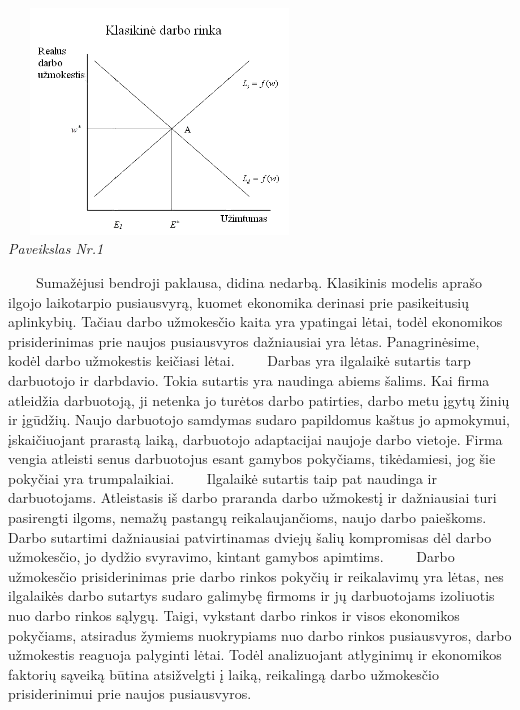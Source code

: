 \documentclass[12pt,a4paper]{article}
\theoremstyle{change}\newtheorem{salyga}{Uždavinys}
\begin{document}
\begin{center}
\includegraphics[width=80mm,height=60mm]{darborinka.PNG}
\\
\textit{Paveikslas Nr.1}
\end{center}

\vskip 8pt
$\qquad $Sumažėjusi bendroji paklausa, didina nedarbą. Klasikinis modelis aprašo ilgojo laikotarpio pusiausvyrą, kuomet ekonomika derinasi prie pasikeitusių aplinkybių. Tačiau darbo užmokesčio kaita yra ypatingai lėtai, todėl ekonomikos prisiderinimas prie naujos pusiausvyros dažniausiai yra lėtas. Panagrinėsime, kodėl darbo užmokestis keičiasi lėtai.
\vskip 8pt
$\qquad $Darbas yra ilgalaikė sutartis tarp darbuotojo ir darbdavio. Tokia sutartis yra naudinga abiems šalims. Kai firma atleidžia darbuotoją, ji netenka jo turėtos darbo patirties, darbo metu įgytų žinių ir įgūdžių. Naujo darbuotojo samdymas sudaro papildomus kaštus jo apmokymui, įskaičiuojant prarastą laiką, darbuotojo adaptacijai naujoje darbo vietoje. Firma vengia atleisti senus darbuotojus esant gamybos pokyčiams, tikėdamiesi, jog šie pokyčiai yra trumpalaikiai. 
\vskip 8pt
$\qquad $Ilgalaikė sutartis taip pat naudinga ir darbuotojams. Atleistasis iš darbo praranda darbo užmokestį ir dažniausiai turi pasirengti ilgoms, nemažų pastangų reikalaujančioms, naujo darbo paieškoms. Darbo sutartimi dažniausiai patvirtinamas dviejų šalių kompromisas dėl darbo užmokesčio, jo dydžio svyravimo, kintant gamybos apimtims.
\vskip 8pt
$\qquad $Darbo užmokesčio prisiderinimas prie darbo rinkos pokyčių ir reikalavimų yra lėtas, nes ilgalaikės darbo sutartys sudaro galimybę firmoms ir jų darbuotojams izoliuotis nuo darbo rinkos sąlygų. Taigi, vykstant darbo rinkos ir visos ekonomikos pokyčiams, atsiradus žymiems nuokrypiams nuo darbo rinkos pusiausvyros, darbo užmokestis reaguoja palyginti lėtai. Todėl analizuojant atlyginimų ir ekonomikos faktorių sąveiką būtina atsižvelgti į laiką, reikalingą darbo užmokesčio prisiderinimui prie naujos pusiausvyros.
\vskip 8pt
\end{document}
